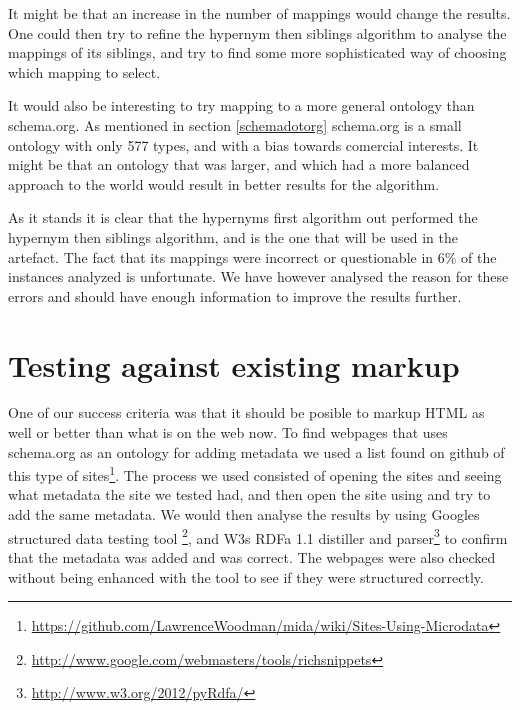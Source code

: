 It might be that an increase in the number of mappings would change the results.
One could then try to refine the hypernym then siblings algorithm to analyse the mappings of its siblings,
and try to find some more sophisticated way of choosing which mapping to select.

It would also be interesting to try mapping to a more general ontology than schema.org.
As mentioned in section \ref{schemadotorg} schema.org is a small ontology with only 577 types,
and with a bias towards comercial interests.
It might be that an ontology that was larger,
and which had a more balanced approach to the world would result in better results for the algorithm.

As it stands it is clear that the hypernyms first algorithm out performed the hypernym then siblings algorithm,
and is the one that will be used in the artefact.
The fact that its mappings were incorrect or questionable in 6\% of the instances analyzed is unfortunate.
We have however analysed the reason for these errors and should have enough information to improve the results further.


\section{Testing against existing markup}
One of our success criteria was that it should be posible to markup HTML as well or better than what is on the web now.
To find webpages that uses schema.org as an ontology for adding metadata we used a list found on github of
this type of sites\footnote{\url{https://github.com/LawrenceWoodman/mida/wiki/Sites-Using-Microdata}}.
The process we used consisted of opening the sites and seeing what metadata the site we tested had,
and then open the site using \theartefact and try to add the same metadata.
We would then analyse the results by using Googles structured data testing tool
\footnote{\url{http://www.google.com/webmasters/tools/richsnippets}},
and W3s RDFa 1.1 distiller and parser\footnote{\url{http://www.w3.org/2012/pyRdfa/}}
to confirm that the metadata was added and was correct.
The webpages were also checked without being enhanced with the tool to see if they were structured correctly.

